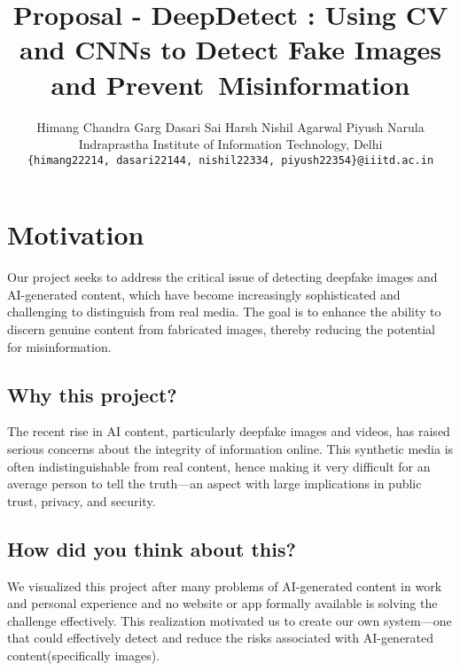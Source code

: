 \documentclass[10pt,twocolumn,letterpaper]{article}
\begin{document}
\title{Proposal - DeepDetect : Using CV and CNNs to Detect Fake Images and Prevent Misinformation}

\author{Himang Chandra Garg \qquad Dasari Sai Harsh \qquad Nishil Agarwal \qquad Piyush Narula\\
Indraprastha Institute of Information Technology, Delhi\\
{\tt\small \{himang22214, dasari22144, nishil22334, piyush22354\}@iiitd.ac.in}
}

\maketitle

\pagestyle{empty}

\section{Motivation}

Our project seeks to address the critical issue of detecting deepfake images and AI-generated content, which have become increasingly sophisticated and challenging to distinguish from real media. 
The goal is to enhance the ability to discern genuine content from fabricated images, thereby reducing the potential for misinformation.

\subsection{Why this project?}

The recent rise in AI content, particularly deepfake images and videos, has raised serious concerns about the integrity of information online. 
This synthetic media is often indistinguishable from real content, hence making it very difficult for an average person to tell the truth—an aspect with large implications in public trust, privacy, and security.

\subsection{How did you think about this?}

We visualized this project after many problems of AI-generated content in work and personal experience and no website or app formally available is solving the challenge effectively. 
This realization motivated us to create our own system—one that could effectively detect and reduce the risks associated with AI-generated content(specifically images).
\end{document}
